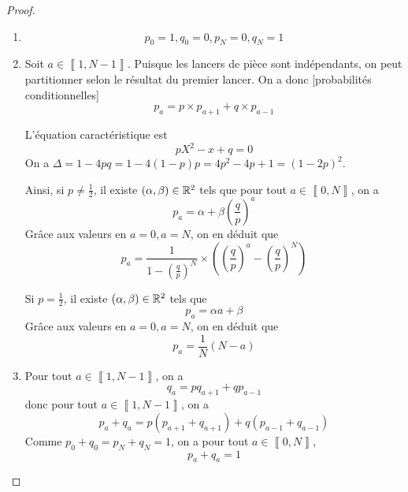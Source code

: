 \begin{proof}
    \phantom{}
    \begin{enumerate}
        \item 
        \begin{equation}
            \boxed{p_{0}=1,q_{0}=0,p_{N}=0,q_{N}=1}
        \end{equation}
        \item Soit $a\in\left\llbracket 1,N-1\right\rrbracket$. Puisque les lancers de pièce sont indépendants, on peut partitionner selon le résultat du premier lancer. On a donc [probabilités conditionnelles]
        \begin{equation}
            \boxed{p_{a}=p\times p_{a+1}+q\times p_{a-1}}
        \end{equation}

        L'équation caractéristique est 
        \begin{equation}
            pX^{2}-x+q=0
        \end{equation}
        On a $\Delta=1-4pq=1-4\left(1-p\right)p=4p^{2}-4p+1=\left(1-2p\right)^{2}$.

        Ainsi, si $p\neq\frac{1}{2}$, il existe $\left(\alpha,\beta\right)\in\mathbb{R}^{2}$ tels que pour tout $a\in\left\llbracket 0,N\right\rrbracket$, on a 
        \begin{equation}
            p_{a}=\alpha+\beta\left(\frac{q}{p}\right)^{a}
        \end{equation}
        Grâce aux valeurs en $a=0,a=N$, on en déduit que 
        \begin{equation}
            \boxed{p_{a}=\frac{1}{1-\left(\frac{q}{p}\right)^{N}}\times\left(\left(\frac{q}{p}\right)^{a}-\left(\frac{q}{p}\right)^{N}\right)}
        \end{equation}

        Si $p=\frac{1}{2}$, il existe $\left(\alpha,\beta\right)\in\mathbb{R}^{2}$ tels que 
        \begin{equation}
            p_{a}=\alpha a+\beta
        \end{equation}
        Grâce aux valeurs en $a=0,a=N$, on en déduit que 
        \begin{equation}
            \boxed{p_{a}=\frac{1}{N}\left(N-a\right)}
        \end{equation}

        \item Pour tout $a\in\left\llbracket 1,N-1\right\rrbracket$, on a 
        \begin{equation}
            q_{a}=pq_{a+1}+qp_{a-1}
        \end{equation}
        donc pour tout $a\in\left\llbracket 1,N-1\right\rrbracket$, on a 
        \begin{equation}
            p_{a}+q_{a}=p\left(p_{a+1}+q_{a+1}\right)+q\left(p_{a-1}+q_{a-1}\right)
        \end{equation}
        Comme $p_{0}+q_{0}=p_{N}+q_{N}=1$, on a pour tout $a\in\left\llbracket 0,N\right\rrbracket$,
        \begin{equation}
            \boxed{p_{a}+q_{a}=1}
        \end{equation}


\end{enumerate}
\end{proof}
